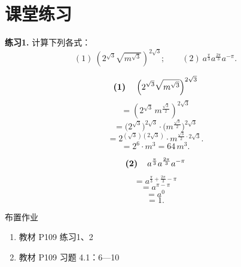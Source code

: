 \documentclass[aspectratio=169,13pt,t,fleqn] {beamer}
\theoremstyle{definition}
\begin{document}
\section{课堂练习}

\begin{frame}[t]{}
	\textbf{练习1.} 计算下列各式：
	\[
	(1)\ \left(2^{\sqrt{3}}\sqrt{m^{\sqrt{3}}}\right)^{2\sqrt{3}};\qquad
	(2)\ a^{\frac{\pi}{3}}a^{\frac{2\pi}{3}}a^{-\pi}.
	\]
	\pause
	\vspace{-1em}
	\begin{tcolorbox}[colback=orange!10,colframe=orange,sidebyside,title=\textbf{解:}]
		
		\[\textbf{(1)\quad} 
		\left(2^{\sqrt{3}}\sqrt{m^{\sqrt{3}}}\right)^{2\sqrt{3}}
		\]
		\[
		=\left(2^{\sqrt{3}}\,m^{\frac{\sqrt{3}}{2}}\right)^{2\sqrt{3}}\]
		\[
		= \bigl(2^{\sqrt{3}}\bigr)^{2\sqrt{3}}\cdot\bigl(m^{\frac{\sqrt{3}}{2}}\bigr)^{2\sqrt{3}}
		\]
		\[
		= 2^{(\sqrt{3})(2\sqrt{3})}\cdot m^{\frac{\sqrt{3}}{2}\cdot 2\sqrt{3}}.
		\]
		\[
		= 2^{6}\cdot m^{3} = 64\,m^{3}.\]
		
		\tcblower
		\[\textbf{(2)\quad} 
		a^{\frac{\pi}{3}}a^{\frac{2\pi}{3}}a^{-\pi}\]
		\[=a^{\frac{\pi}{3}+\frac{2\pi}{3}-\pi} \]
		\[= a^{\pi-\pi} \]
		\[= a^{0} \]
		\[= 1.
		\]
	\end{tcolorbox}
\end{frame}

\begin{frame}{布置作业}
	\begin{summarybox}[课后作业]
		\begin{enumerate}
			\item 教材 P109 练习1、2
			\item 教材 P109 习题 4.1：6---10
		\end{enumerate}
	\end{summarybox}
\end{frame}
\end{document}
